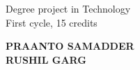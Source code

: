 \begin{titlepage}
    \begin{figure}[h]
        \centering
        
    \end{figure}

    \vspace{1cm}
    \begin{center}
        \large Degree project in Technology \\
        \vspace{0.5cm}
        \small First cycle, 15 credits
    \end{center}
    \vspace{1cm}

    \begin{center}
        \huge \textbf{\titletext}
    \end{center}

    \vspace{0.25cm}
    \begin{center}
        \Large \text{\subtitletext}
    \end{center}
    \vspace{0.25cm}
    
    \begin{center}
        \large \textbf{PRAANTO SAMADDER} \\
        \large \textbf{RUSHIL GARG}
    \end{center}
\end{titlepage}

